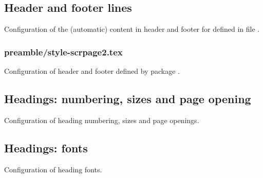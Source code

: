 
\subsection{Header and footer lines}
\label{sec:style:headfoot}

Configuration of the (automatic) content in header and footer for  defined in file .


\subsubsection{preamble/style-scrpage2.tex}

Configuration of header and footer defined by package . 


\subsection{Headings: numbering, sizes and page opening}
\label{sec:style:headings}

Configuration of heading numbering, sizes and page openings.


\subsection{Headings: fonts}
\label{sec:style:headings:fonts}

Configuration of heading fonts.


